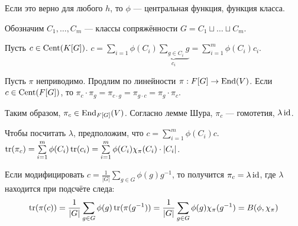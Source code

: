 Если это верно для любого $h$, то $\phi$ --- центральная функция, функция класса.

Обозначим $C_1, \dots, C_m$ --- классы сопряжённости $G = C_1 \sqcup \dots \sqcup C_m$.

Пусть $c \in \operatorname{Cent}(K[G])$. $c = \sum\limits_{i = 1}\phi(C_i)\underbrace{\sum\limits_{g \in C_i}g}_{c_i} = \sum\limits_{i = 1}^{m}\phi(C_i)c_i$.

Пусть $\pi$ неприводимо.
Продлим по линейности $\pi: F[G] \rightarrow \operatorname{End}(V)$.
Если $c \in \operatorname{Cent}(F[G])$, то $\pi_c \cdot \pi_g = \pi_{c \cdot g} = \pi_{g \cdot c} = \pi_g \cdot \pi_c$.

Таким образом, $\pi_c \in \operatorname{End}_{F[G]}(V)$.
Согласно лемме Шура, $\pi_c$ --- гомотетия, $\lambda \operatorname{id}$.

Чтобы посчитать $\lambda$, предположим, что $c = \sum\limits_{i = 1}^{m}\phi(C_i)c$. $\operatorname{tr}(\pi_c) = \sum\limits_{i = 1}^{m}\phi(C_i)\operatorname{tr}(c_i) = \sum\limits_{i = 1}^{m}\phi(C_i)\chi_{\pi}(C_i) \cdot |C_i|$.

Если модифицировать $c = \frac{1}{|G|}\sum\limits_{g \in G}\phi(g)g^{-1}$, то получится $\pi_c = \lambda \operatorname{id}$, где $\lambda$ находится при подсчёте следа:
\[\operatorname{tr}(\pi(c)) = \frac{1}{|G|}\sum\limits_{g \in G}\phi(g)\operatorname{tr}(\pi(g^{-1})) = \frac{1}{|G|}\sum\limits_{g \in G}\phi(g)\chi_\pi(g^{-1}) = B(\phi,\chi_{\pi})\]



